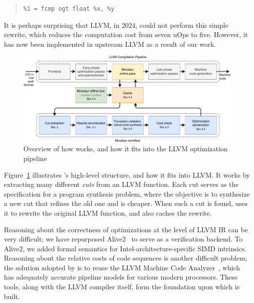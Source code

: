 {\begin{quote}\begin{verbatim}
%1 = fcmp ogt float %x, %y
\end{verbatim}
\end{quote}}

It is perhaps surprising that LLVM, in 2024, could not perform this
simple rewrite, which reduces the computation cost from seven uOps to
five.
%
However, it has now been implemented in upstream LLVM as a result of
our work.

\begin{figure}[tbp]
    \includegraphics[width=\linewidth]{figures/flowchart.pdf}
    \caption{Overview of how \minotaur{} works, and how it fits into the
      LLVM optimization pipeline}
    \label{fig:workflow}
\end{figure}

Figure~\ref{fig:workflow} illustrates \minotaur's high-level structure,
and how it fits into LLVM\@.
%
It works by extracting many different \textit{cuts} from an LLVM function.
%
Each cut serves as the specification for a program synthesis
problem, where the objective is to synthesize a new cut that refines
the old one and is cheaper.
%
When such a cut is found, \minotaur{} uses it to rewrite the original
LLVM function, and also caches the rewrite.


Reasoning about the correctness of optimizations at the level of LLVM
IR can be very difficult; we have repurposed Alive2~\cite{alive2} to
serve as a verification backend.
%
To Alive2, we added formal semantics for Intel-architecture-specific
SIMD intrinsics.
%
Reasoning about the relative costs of code sequences is another
difficult problem; the solution adopted by \minotaur{} is to reuse the
LLVM Machine Code Analyzer~\cite{llvmmca}, which has adequately
accurate pipeline models for various modern processors.
%
These tools, along with the LLVM compiler itself, form the
foundation upon which \minotaur{} is built.


